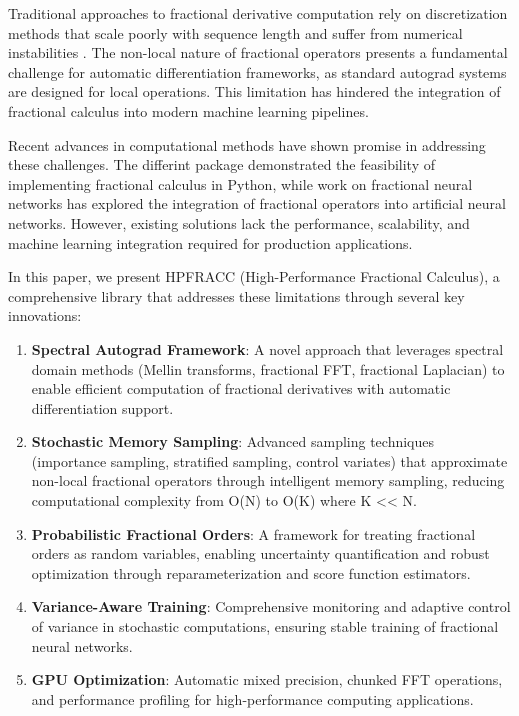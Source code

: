 \documentclass[12pt]{article}
\begin{document}
Traditional approaches to fractional derivative computation rely on discretization methods that scale poorly with sequence length and suffer from numerical instabilities \cite{Gong2015ComputationalChallengeFDE}. The non-local nature of fractional operators presents a fundamental challenge for automatic differentiation frameworks, as standard autograd systems are designed for local operations. This limitation has hindered the integration of fractional calculus into modern machine learning pipelines.

Recent advances in computational methods have shown promise in addressing these challenges. The differint package \cite{Adams2019DifferintPythonPackage} demonstrated the feasibility of implementing fractional calculus in Python, while work on fractional neural networks \cite{Zhou2025FractionalOrderJacobianANN} has explored the integration of fractional operators into artificial neural networks. However, existing solutions lack the performance, scalability, and machine learning integration required for production applications.

In this paper, we present HPFRACC (High-Performance Fractional Calculus), a comprehensive library that addresses these limitations through several key innovations:

\begin{enumerate}
\item \textbf{Spectral Autograd Framework}: A novel approach that leverages spectral domain methods (Mellin transforms, fractional FFT, fractional Laplacian) to enable efficient computation of fractional derivatives with automatic differentiation support.

\item \textbf{Stochastic Memory Sampling}: Advanced sampling techniques (importance sampling, stratified sampling, control variates) that approximate non-local fractional operators through intelligent memory sampling, reducing computational complexity from O(N) to O(K) where K << N.

\item \textbf{Probabilistic Fractional Orders}: A framework for treating fractional orders as random variables, enabling uncertainty quantification and robust optimization through reparameterization and score function estimators.

\item \textbf{Variance-Aware Training}: Comprehensive monitoring and adaptive control of variance in stochastic computations, ensuring stable training of fractional neural networks.

\item \textbf{GPU Optimization}: Automatic mixed precision, chunked FFT operations, and performance profiling for high-performance computing applications.
\end{enumerate}
\end{document}
